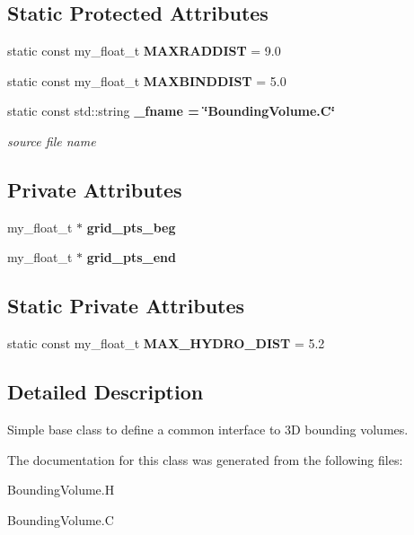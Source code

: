 \subsection*{Static Protected Attributes}
\begin{CompactItemize}
\item 
static const my\_\-float\_\-t \textbf{MAXRADDIST} = 9.0\label{classASCbase_1_1BoundingVolume_a1cfa33783949f5c420c9887d6e51060}

\item 
static const my\_\-float\_\-t \textbf{MAXBINDDIST} = 5.0\label{classASCbase_1_1BoundingVolume_2309329304fbe3f248255dac05b91aa8}

\item 
static const std::string \bf{\_\-fname} = \char`\"{}Bounding\-Volume.C\char`\"{}\label{classASCbase_1_1BoundingVolume_ab8b9606c0e2f06271e6de0fbbae62af}

\begin{CompactList}\small\item\em source file name \item\end{CompactList}\end{CompactItemize}
\subsection*{Private Attributes}
\begin{CompactItemize}
\item 
my\_\-float\_\-t $\ast$ \textbf{grid\_\-pts\_\-beg}\label{classASCbase_1_1BoundingVolume_0c620a298e09563e4b8e63c4122a3864}

\item 
my\_\-float\_\-t $\ast$ \textbf{grid\_\-pts\_\-end}\label{classASCbase_1_1BoundingVolume_7cedadbeb63b343521502aacfed7f273}

\end{CompactItemize}
\subsection*{Static Private Attributes}
\begin{CompactItemize}
\item 
static const my\_\-float\_\-t \textbf{MAX\_\-HYDRO\_\-DIST} = 5.2\label{classASCbase_1_1BoundingVolume_bd0078867dd8810c162dc6c2cf096e6e}

\end{CompactItemize}


\subsection{Detailed Description}
Simple base class to define a common interface to 3D bounding volumes. 



The documentation for this class was generated from the following files:\begin{CompactItemize}
\item 
Bounding\-Volume.H\item 
Bounding\-Volume.C\end{CompactItemize}
